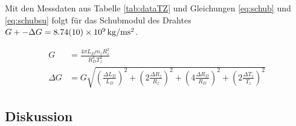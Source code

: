 Mit den Messdaten aus Tabelle \ref{tab:dataTZ} und Gleichungen \ref{eq:schub} und \ref{eq:schubsu} folgt für das Schubmodul  des Drahtes $G+-\Delta G =\SI{8.74+-0.10e9}{kg \per \metre \second \squared}$.




\begin{align}
	G&= \frac{4 \pi L_D m_z R_z^2}{R_D^4 T_z^2}
	\label{eq:schub}\\
	\Delta G &= G \sqrt{
		\left( \frac{\Delta L_D}{L_D} \right)^2+
		\left(2 \frac{\Delta R_z}{R_z} \right)^2+
		\left( 4 \frac{\Delta R_D}{R_D} \right)^2+
		\left( 2 \frac{\Delta T_z}{T_z} \right)^2 } \label{eq:schubsu}
\end{align}








\subsection{Diskussion}


